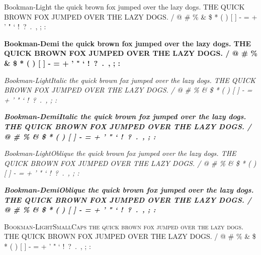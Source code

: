 \documentclass{article}
\begin{document}
\newpage
{\selectfont
Bookman-Light \newline
the quick brown fox jumped over the lazy dogs. \newline
THE QUICK BROWN FOX JUMPED OVER THE LAZY DOGS.  / @ \# \% \& \$ * ( ) [ ] - = + ' " ` !\ ?\ .\ , ; :  \par
{\bfseries
Bookman-Demi \newline
the quick brown fox jumped over the lazy dogs. \newline
THE QUICK BROWN FOX JUMPED OVER THE LAZY DOGS.  / @ \# \% \& \$ * ( ) [ ] - = + ' " ` !\ ?\ .\ , ; : } \par
{\itshape
Bookman-LightItalic \newline
the quick brown fox jumped over the lazy dogs. \newline
THE QUICK BROWN FOX JUMPED OVER THE LAZY DOGS.  / @ \# \% \& \$ * ( ) [ ] - = + ' " ` !\ ?\ .\ , ; : } \par
{\bfseries \itshape
Bookman-DemiItalic \newline
the quick brown fox jumped over the lazy dogs. \newline
THE QUICK BROWN FOX JUMPED OVER THE LAZY DOGS.  / @ \# \% \& \$ * ( ) [ ] - = + ' " ` !\ ?\ .\ , ; : } \par
{\slshape
Bookman-LightOblique \newline
the quick brown fox jumped over the lazy dogs. \newline
THE QUICK BROWN FOX JUMPED OVER THE LAZY DOGS.  / @ \# \% \& \$ * ( ) [ ] - = + ' " ` !\ ?\ .\ , ; : } \par
{\bfseries \slshape
Bookman-DemiOblique \newline
the quick brown fox jumped over the lazy dogs. \newline
THE QUICK BROWN FOX JUMPED OVER THE LAZY DOGS.  / @ \# \% \& \$ * ( ) [ ] - = + ' " ` !\ ?\ .\ , ; : } \par
{\scshape
Bookman-LightSmallCaps \newline
the quick brown fox jumped over the lazy dogs. \newline
THE QUICK BROWN FOX JUMPED OVER THE LAZY DOGS.  / @ \# \% \& \$ * ( ) [ ] - = + ' " ` !\ ?\ .\ , ; : }} \par
\end{document}
